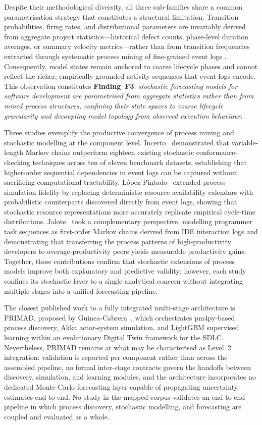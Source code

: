 Despite their methodological diversity, all three sub-families share a common
parametrisation strategy that constitutes a structural limitation. Transition
probabilities, firing rates, and distributional parameters are invariably derived
from aggregate project statistics---historical defect counts, phase-level duration
averages, or summary velocity metrics---rather than from transition frequencies
extracted through systematic process mining of fine-grained event logs
\cite{nafreen2020,bhadra2022,li2020}. Consequently, model states remain anchored
to coarse lifecycle phases and cannot reflect the richer, empirically grounded
activity sequences that event logs encode. This observation constitutes
\textbf{Finding~F3}: \emph{stochastic forecasting models for software development
are parametrised from aggregate statistics rather than from mined process
structures, confining their state spaces to coarse lifecycle granularity and
decoupling model topology from observed execution behaviour}.

Three studies exemplify the productive convergence of process mining and
stochastic modelling at the component level. Incerto~\cite{incerto2025}
demonstrated that variable-length Markov chains outperform eighteen existing
stochastic conformance-checking techniques across ten of eleven benchmark
datasets, establishing that higher-order sequential dependencies in event logs
can be captured without sacrificing computational tractability.
L\'opez-Pintado~\cite{lopezpintado2023} extended process-simulation fidelity by
replacing deterministic resource-availability calendars with probabilistic
counterparts discovered directly from event logs, showing that stochastic
resource representations more accurately replicate empirical cycle-time
distributions. Jalote~\cite{jalote2021} took a complementary perspective,
modelling programmer task sequences as first-order Markov chains derived from
IDE interaction logs and demonstrating that transferring the process patterns of
high-productivity developers to average-productivity peers yields measurable
productivity gains. Together, these contributions confirm that stochastic
extensions of process models improve both explanatory and predictive validity;
however, each study confines its stochastic layer to a single analytical
concern without integrating multiple stages into a unified forecasting pipeline.

The closest published work to a fully integrated multi-stage architecture is
PRIMAD, proposed by Guinea-Cabrera~\cite{guinea2025}, which orchestrates
pm4py-based process discovery, Akka actor-system simulation, and LightGBM
supervised learning within an evolutionary Digital Twin framework for the SDLC.
Nevertheless, PRIMAD remains at what may be characterised as Level~2 integration:
validation is reported per component rather than across the assembled pipeline,
no formal inter-stage contracts govern the handoffs between discovery,
simulation, and learning modules, and the architecture incorporates no dedicated
Monte Carlo forecasting layer capable of propagating uncertainty estimates
end-to-end. No study in the mapped corpus validates an end-to-end pipeline in
which process discovery, stochastic modelling, and forecasting are coupled and
evaluated as a whole.

